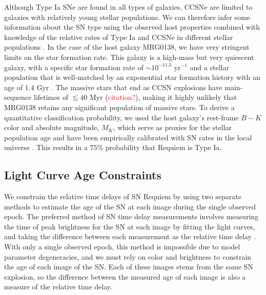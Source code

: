 \documentclass[12pt,dvipsnames]{article}
\begin{document}
Although Type Ia SNe are found in all types of galaxies, CCSNe are limited to galaxies with relatively young stellar populations.  We can therefore infer some information about the SN type using the observed host properties combined with knowledge of the relative rates of Type Ia and CCSNe in different stellar populations \cite{mannucci_rates_2005,foley_classifying_2013}.  In the case of the host galaxy MRG0138, we have very stringent limits on the star formation rate. This galaxy is a high-mass but very quiescent galaxy, with a specific star formation rate of $\sim10^{-11.3}$ yr$^{-1}$  and a stellar population that is well-matched by an exponential star formation history with an age of $1.4$ Gyr \cite{newman_resolving_2018}.  The massive stars that end as CCSN explosions have main-sequence lifetimes of $\lesssim 40$ Myr (\textcolor{red}{citation?}),  making it highly unlikely that MRG0138 retains any significant population of massive stars. To derive a quantitative classification probability, we used the host galaxy's rest-frame $B-K$ color and absolute magnitude, $M_K$, which serve as proxies for the stellar population age and have been empirically calibrated with SN rates in the local universe  \cite{foley_classifying_2013}.  This 
results in a $75\%$ probability that Requiem is Type Ia.





\subsection*{Light Curve Age Constraints}
We constrain the relative time delays of SN Requiem by using two separate methods to estimate the age of the SN at each image during the single observed epoch. The preferred method of SN time delay measurements involves measuring the time of peak brightness for the SN at each image by fitting the light curves, and taking the difference between each measurement as the relative time delay \cite{pierel_turning_2019,dhawan_magnification_2019,huber_strongly_2019}. With only a single observed epoch, this method is impossible due to model parameter degeneracies, and we must rely on color and brightness to constrain the age of each image of the SN. Each of these images stems from the same SN explosion, so the difference between the measured age of each image is also a measure of the relative time delay. 
\end{document}
